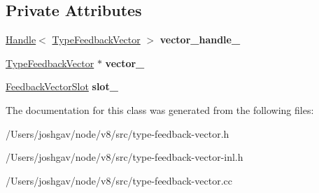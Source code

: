 \subsection*{Private Attributes}
\begin{DoxyCompactItemize}
\item 
\hyperlink{classv8_1_1internal_1_1_handle}{Handle}$<$ \hyperlink{classv8_1_1internal_1_1_type_feedback_vector}{Type\+Feedback\+Vector} $>$ {\bfseries vector\+\_\+handle\+\_\+}\hypertarget{classv8_1_1internal_1_1_feedback_nexus_a4b3264af6d465ec45af890dc7dda4cb6}{}\label{classv8_1_1internal_1_1_feedback_nexus_a4b3264af6d465ec45af890dc7dda4cb6}

\item 
\hyperlink{classv8_1_1internal_1_1_type_feedback_vector}{Type\+Feedback\+Vector} $\ast$ {\bfseries vector\+\_\+}\hypertarget{classv8_1_1internal_1_1_feedback_nexus_a5d02418d4be326e4510f806b02916574}{}\label{classv8_1_1internal_1_1_feedback_nexus_a5d02418d4be326e4510f806b02916574}

\item 
\hyperlink{classv8_1_1internal_1_1_feedback_vector_slot}{Feedback\+Vector\+Slot} {\bfseries slot\+\_\+}\hypertarget{classv8_1_1internal_1_1_feedback_nexus_a28e08cd64c71123335b8b37b757c43fc}{}\label{classv8_1_1internal_1_1_feedback_nexus_a28e08cd64c71123335b8b37b757c43fc}

\end{DoxyCompactItemize}


The documentation for this class was generated from the following files\+:\begin{DoxyCompactItemize}
\item 
/\+Users/joshgav/node/v8/src/type-\/feedback-\/vector.\+h\item 
/\+Users/joshgav/node/v8/src/type-\/feedback-\/vector-\/inl.\+h\item 
/\+Users/joshgav/node/v8/src/type-\/feedback-\/vector.\+cc\end{DoxyCompactItemize}
